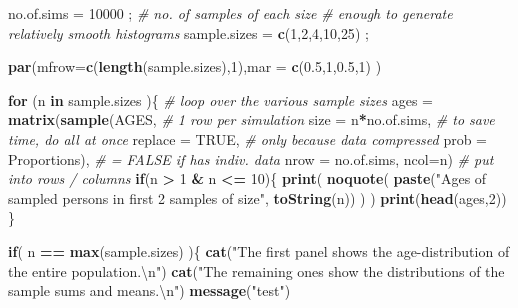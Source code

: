 \documentclass[]{book}
\newenvironment{Shaded}{\begin{snugshade}}{\end{snugshade}}
\newcommand{\CharTok}[1]{\textcolor[rgb]{0.31,0.60,0.02}{#1}}
\newcommand{\CommentTok}[1]{\textcolor[rgb]{0.56,0.35,0.01}{\textit{#1}}}
\newcommand{\ControlFlowTok}[1]{\textcolor[rgb]{0.13,0.29,0.53}{\textbf{#1}}}
\newcommand{\DataTypeTok}[1]{\textcolor[rgb]{0.13,0.29,0.53}{#1}}
\newcommand{\DecValTok}[1]{\textcolor[rgb]{0.00,0.00,0.81}{#1}}
\newcommand{\FloatTok}[1]{\textcolor[rgb]{0.00,0.00,0.81}{#1}}
\newcommand{\KeywordTok}[1]{\textcolor[rgb]{0.13,0.29,0.53}{\textbf{#1}}}
\newcommand{\NormalTok}[1]{#1}
\newcommand{\OperatorTok}[1]{\textcolor[rgb]{0.81,0.36,0.00}{\textbf{#1}}}
\newcommand{\OtherTok}[1]{\textcolor[rgb]{0.56,0.35,0.01}{#1}}
\newcommand{\StringTok}[1]{\textcolor[rgb]{0.31,0.60,0.02}{#1}}
\begin{document}
\begin{Shaded}
\begin{Highlighting}[]
\NormalTok{no.of.sims =}\StringTok{ }\DecValTok{10000}\NormalTok{ ;  }\CommentTok{# no. of samples of each size}
                      \CommentTok{# enough to generate relatively smooth histograms  }
\NormalTok{sample.sizes =}\StringTok{ }\KeywordTok{c}\NormalTok{(}\DecValTok{1}\NormalTok{,}\DecValTok{2}\NormalTok{,}\DecValTok{4}\NormalTok{,}\DecValTok{10}\NormalTok{,}\DecValTok{25}\NormalTok{) ; }

\KeywordTok{par}\NormalTok{(}\DataTypeTok{mfrow=}\KeywordTok{c}\NormalTok{(}\KeywordTok{length}\NormalTok{(sample.sizes),}\DecValTok{1}\NormalTok{),}\DataTypeTok{mar =} \KeywordTok{c}\NormalTok{(}\FloatTok{0.5}\NormalTok{,}\DecValTok{1}\NormalTok{,}\FloatTok{0.5}\NormalTok{,}\DecValTok{1}\NormalTok{) )}

\ControlFlowTok{for}\NormalTok{ (n }\ControlFlowTok{in}\NormalTok{ sample.sizes )\{        }\CommentTok{# loop over the various sample sizes}
\NormalTok{   ages =}\StringTok{ }\KeywordTok{matrix}\NormalTok{(}\KeywordTok{sample}\NormalTok{(AGES,          }\CommentTok{# 1 row per simulation}
              \DataTypeTok{size =}\NormalTok{ n}\OperatorTok{*}\NormalTok{no.of.sims,     }\CommentTok{# to save time, do all at once}
              \DataTypeTok{replace =} \OtherTok{TRUE}\NormalTok{,          }\CommentTok{# only because data compressed}
              \DataTypeTok{prob =}\NormalTok{ Proportions),     }\CommentTok{# = FALSE if has indiv. data}
          \DataTypeTok{nrow =}\NormalTok{ no.of.sims, }\DataTypeTok{ncol=}\NormalTok{n) }\CommentTok{# put into rows / columns}
   \ControlFlowTok{if}\NormalTok{(n }\OperatorTok{>}\StringTok{ }\DecValTok{1} \OperatorTok{&}\StringTok{ }\NormalTok{n }\OperatorTok{<=}\StringTok{ }\DecValTok{10}\NormalTok{)\{}
     \KeywordTok{print}\NormalTok{( }\KeywordTok{noquote}\NormalTok{(}
      \KeywordTok{paste}\NormalTok{(}\StringTok{"Ages of sampled persons in first 2 samples of size"}\NormalTok{,  }
            \KeywordTok{toString}\NormalTok{(n)) )   ) }
     \KeywordTok{print}\NormalTok{(}\KeywordTok{head}\NormalTok{(ages,}\DecValTok{2}\NormalTok{))}
\NormalTok{   \}}
   
   \ControlFlowTok{if}\NormalTok{( n }\OperatorTok{==}\StringTok{ }\KeywordTok{max}\NormalTok{(sample.sizes) )\{}
     \KeywordTok{cat}\NormalTok{(}\StringTok{"The first panel shows the age-distribution of the entire population.}\CharTok{\textbackslash{}n}\StringTok{"}\NormalTok{)}
     \KeywordTok{cat}\NormalTok{(}\StringTok{"The remaining ones show the  distributions of the sample sums and means.}\CharTok{\textbackslash{}n}\StringTok{"}\NormalTok{)}
     \KeywordTok{message}\NormalTok{(}\StringTok{"test"}\NormalTok{)}
     

\end{Highlighting}
\end{Shaded}
\end{document}
